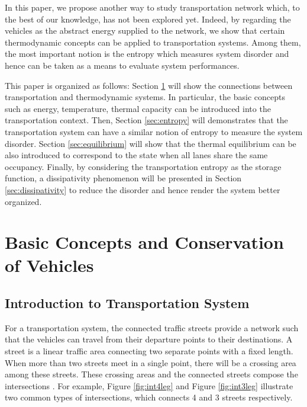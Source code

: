 \documentclass[trsc,nonblindrev]{informs3} %
\begin{document}
In this paper, we propose another way to study transportation network
which, to the best of our knowledge,  has not been explored yet.
Indeed, by regarding the vehicles as the abstract energy supplied to
the network, we show that certain thermodynamic concepts can be
applied to transportation systems. Among them, the most important
notion is the entropy which measures system disorder and hence can be
taken as a means to evaluate system performances.

This paper is organized as follows: Section \ref{sec:concepts} will
show the connections between transportation and thermodynamic
systems. In particular, the basic concepts such as energy,
temperature, thermal capacity can be introduced into the
transportation context. Then, Section \ref{sec:entropy} will
demonstrates that the transportation system can have a similar notion
of entropy to measure the system disorder.
Section \ref{sec:equilibrium} will show that the thermal equilibrium
can be also introduced to correspond to the state when all lanes share
the same occupancy.
Finally, by considering the transportation entropy as the storage
function, a dissipativity phenomenon will be presented in Section
\ref{sec:dissipativity} to reduce the disorder and hence render the
system better organized.

\section{Basic Concepts and Conservation of Vehicles}\label{sec:concepts}

\subsection{Introduction to Transportation System}

For a transportation system, the connected traffic streets provide a
network such that the vehicles can travel from their departure points
to their destinations. A street is a linear traffic area connecting
two separate points with a fixed length. When more than two streets
meet in a single point, there will be a crossing area among these
streets. These crossing areas and the connected streets compose the
intersections \citep{papageorgiou_review_2003}. For example, Figure
\ref{fig:int4leg} and Figure \ref{fig:int3leg} illustrate two common
types of intersections, which connects 4 and 3 streets respectively.
\end{document}
